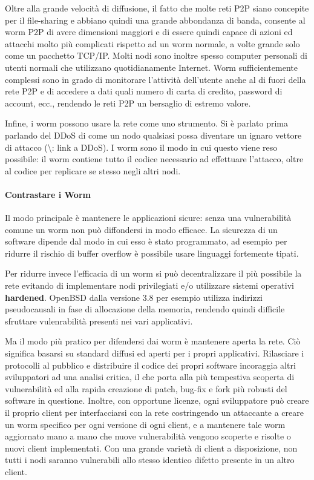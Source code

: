 Oltre alla grande velocità di diffusione, il fatto che molte reti P2P
siano concepite per il file-sharing e abbiano quindi una grande
abbondanza di banda, consente al worm P2P di avere dimensioni maggiori e
di essere quindi capace di azioni ed attacchi molto più complicati
rispetto ad un worm normale, a volte grande solo come un pacchetto
TCP/IP. Molti nodi sono inoltre spesso computer personali di utenti
normali che utilizzano quotidianamente Internet. Worm sufficientemente
complessi sono in grado di monitorare l'attività dell'utente anche al di
fuori della rete P2P e di accedere a dati quali numero di carta di
credito, password di account, ecc., rendendo le reti P2P un bersaglio di
estremo valore.

Infine, i worm possono usare la rete come uno strumento. Si è parlato
prima parlando del DDoS di come un nodo qualsiasi possa diventare un
ignaro vettore di attacco (\textbackslash{}\TODO: link a DDoS). I worm
sono il modo in cui questo viene reso possibile: il worm contiene tutto
il codice necessario ad effettuare l'attacco, oltre al codice per
replicare se stesso negli altri nodi.

\paragraph{Contrastare i Worm}\label{contrastare-i-worm}

Il modo principale è mantenere le applicazioni sicure: senza una
vulnerabilità comune un worm non può diffondersi in modo efficace. La
sicurezza di un software dipende dal modo in cui esso è stato
programmato, ad esempio per ridurre il rischio di buffer overflow è
possibile usare linguaggi fortemente tipati.

Per ridurre invece l'efficacia di un worm si può decentralizzare il più
possibile la rete evitando di implementare nodi privilegiati e/o
utilizzare sistemi operativi \textbf{hardened}. OpenBSD dalla versione
3.8 per esempio utilizza indirizzi pseudocausali in fase di allocazione
della memoria, rendendo quindi difficile sfruttare vulenrabilità
presenti nei vari applicativi.

Ma il modo più pratico per difendersi dai worm è mantenere aperta la
rete. Ciò significa basarsi su standard diffusi ed aperti per i propri
applicativi. Rilasciare i protocolli al pubblico e distribuire il codice
dei propri software incoraggia altri sviluppatori ad una analisi
critica, il che porta alla più tempestiva scoperta di vulnerabilità ed
alla rapida creazione di patch, bug-fix e fork più robusti del software
in questione. Inoltre, con opportune licenze, ogni sviluppatore può
creare il proprio client per interfacciarsi con la rete costringendo un
attaccante a creare un worm specifico per ogni versione di ogni client,
e a mantenere tale worm aggiornato mano a mano che nuove vulnerabilità
vengono scoperte e risolte o nuovi client implementati. Con una grande
varietà di client a disposizione, non tutti i nodi saranno vulnerabili
allo stesso identico difetto presente in un altro client.


